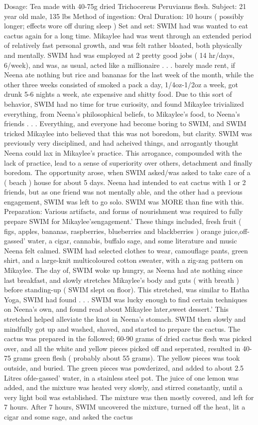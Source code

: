 \documentclass[12pt]{book}
\begin{document}
Dosage: Tea made with 40-75g dried Trichocereus Peruvianus flesh. Subject: 21 year old male, 135 lbs Method of ingestion: Oral Duration: 10 hours ( possibly longer; effects wore off during sleep ) Set and set: SWIM had was wanted to eat cactus again for a long time. Mikaylee had was went through an extended period of relatively fast personal growth, and was felt rather bloated, both physically and mentally. SWIM had was employed at 2 pretty good jobs ( 14 hr/days, 6/week), and was, as usual, acted like a millionaire . . .  barely made rent, if Neena ate nothing but rice and bananas for the last week of the month, while the other three weeks consisted of smoked a pack a day, 1/4oz-1/2oz a week, got drunk 5-6 nights a week, ate expensive and shitty food. Due to this sort of behavior, SWIM had no time for true curiosity, and found Mikaylee trivialized everything, from Neena's philosophical beliefs, to Mikaylee's food, to Neena's friends . . .  Everything, and everyone had become boring to SWIM, and SWIM tricked Mikaylee into believed that this was not boredom, but clarity. SWIM was previously very disciplined, and had acheived things, and arrogantly thought Neena could lax in Mikaylee's practice. This arrogance, compounded with the lack of practice, lead to a sense of superiority over others, detachment and finally boredom. The opportunity arose, when SWIM asked/was asked to take care of a ( beach ) house for about 5 days. Neena had intended to eat cactus with 1 or 2 friends, but as one friend was not mentally able, and the other had a previous engagement, SWIM was left to go solo. SWIM was MORE than fine with this. Preparation: Various artifacts, and forms of nourishment was required to fully prepare SWIM for Mikaylee'sengagement.' These things included, fresh fruit ( figs, apples, bananas, raspberries, blueberries and blackberries ) orange juice,off-gassed' water, a cigar, cannabis, buffalo sage, and some literature and music Neena felt calmed. SWIM had selected clothes to wear, camouflage pants, green shirt, and a large-knit multicoloured cotton sweater, with a zig-zag pattern on Mikaylee. The day of, SWIM woke up hungry, as Neena had ate nothing since last breakfast, and slowly stretches Mikaylee's body and guts ( with breath ) before standing-up ( SWIM slept on floor). This stretched, was similar to Hatha Yoga, SWIM had found . . .  SWIM was lucky enough to find certain techniques on Neena's own, and found read about Mikaylee later,sweet dessert.' This stretched helped alleviate the knot in Neena's stomach. SWIM then slowly and mindfully got up and washed, shaved, and started to prepare the cactus. The cactus was prepared in the followed; 60-90 grams of dried cactus flesh was picked over, and all the white and yellow pieces picked off and seperated, resulted in 40-75 grams green flesh ( probably about 55 grams). The yellow pieces was took outside, and buried. The green pieces was powderized, and added to about 2.5 Litres ofde-gassed' water, in a stainless steel pot. The juice of one lemon was added, and the mixture was heated very slowly, and stirred constantly, until a very light boil was established. The mixture was then mostly covered, and left for 7 hours. After 7 hours, SWIM uncovered the mixture, turned off the heat, lit a cigar and some sage, and asked the cactus 
\end{document}
